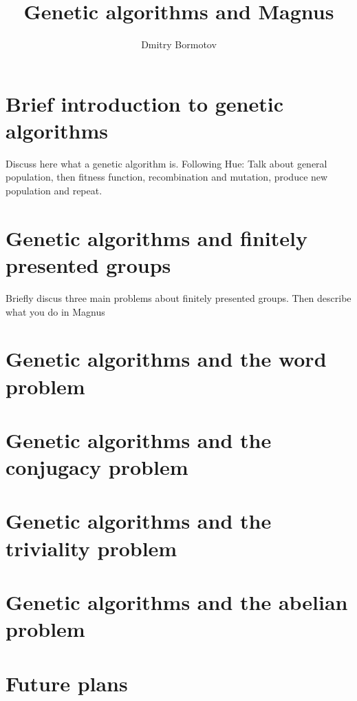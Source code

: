 \documentclass[12pt]{article}
\title{Genetic algorithms and Magnus}
\author{Dmitry Bormotov}
\date{}
\begin{document}
\maketitle
\section{Brief introduction to genetic algorithms}
Discuss here what a genetic algorithm is. Following Hue:
Talk about general population, then fitness function, recombination 
and mutation, produce new population and repeat.
\section{Genetic algorithms and finitely presented groups}
Briefly discus three main problems about finitely presented groups.
Then describe what you do in Magnus
\section{Genetic algorithms and the word problem}
\section{Genetic algorithms and the conjugacy problem}
\section{Genetic algorithms and the triviality problem}
\section{Genetic algorithms and the abelian problem}
\section{Future plans}
\end{document}
